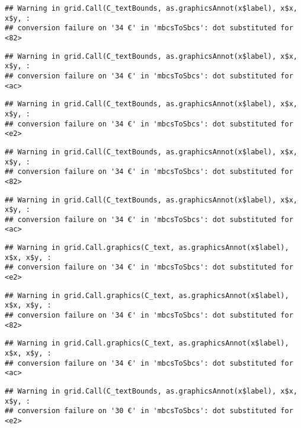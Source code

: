 \documentclass[
]{article}
\begin{document}
\begin{verbatim}
## Warning in grid.Call(C_textBounds, as.graphicsAnnot(x$label), x$x, x$y, :
## conversion failure on '34 €' in 'mbcsToSbcs': dot substituted for <82>
\end{verbatim}

\begin{verbatim}
## Warning in grid.Call(C_textBounds, as.graphicsAnnot(x$label), x$x, x$y, :
## conversion failure on '34 €' in 'mbcsToSbcs': dot substituted for <ac>
\end{verbatim}

\begin{verbatim}
## Warning in grid.Call(C_textBounds, as.graphicsAnnot(x$label), x$x, x$y, :
## conversion failure on '34 €' in 'mbcsToSbcs': dot substituted for <e2>
\end{verbatim}

\begin{verbatim}
## Warning in grid.Call(C_textBounds, as.graphicsAnnot(x$label), x$x, x$y, :
## conversion failure on '34 €' in 'mbcsToSbcs': dot substituted for <82>
\end{verbatim}

\begin{verbatim}
## Warning in grid.Call(C_textBounds, as.graphicsAnnot(x$label), x$x, x$y, :
## conversion failure on '34 €' in 'mbcsToSbcs': dot substituted for <ac>
\end{verbatim}

\begin{verbatim}
## Warning in grid.Call.graphics(C_text, as.graphicsAnnot(x$label), x$x, x$y, :
## conversion failure on '34 €' in 'mbcsToSbcs': dot substituted for <e2>
\end{verbatim}

\begin{verbatim}
## Warning in grid.Call.graphics(C_text, as.graphicsAnnot(x$label), x$x, x$y, :
## conversion failure on '34 €' in 'mbcsToSbcs': dot substituted for <82>
\end{verbatim}

\begin{verbatim}
## Warning in grid.Call.graphics(C_text, as.graphicsAnnot(x$label), x$x, x$y, :
## conversion failure on '34 €' in 'mbcsToSbcs': dot substituted for <ac>
\end{verbatim}

\begin{verbatim}
## Warning in grid.Call(C_textBounds, as.graphicsAnnot(x$label), x$x, x$y, :
## conversion failure on '30 €' in 'mbcsToSbcs': dot substituted for <e2>
\end{verbatim}
\end{document}
